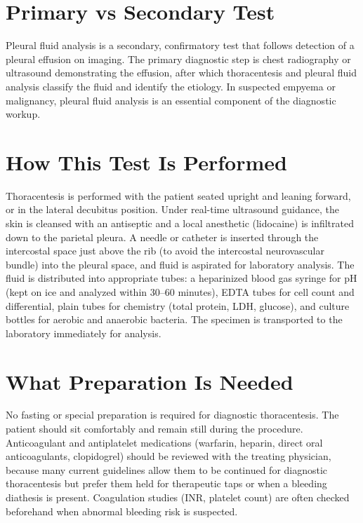 \section*{Primary vs Secondary Test}
Pleural fluid analysis is a secondary, confirmatory test that follows detection of a pleural effusion on imaging. The primary diagnostic step is chest radiography or ultrasound demonstrating the effusion, after which thoracentesis and pleural fluid analysis classify the fluid and identify the etiology. In suspected empyema or malignancy, pleural fluid analysis is an essential component of the diagnostic workup.
\section*{How This Test Is Performed}
Thoracentesis is performed with the patient seated upright and leaning forward, or in the lateral decubitus position. Under real-time ultrasound guidance, the skin is cleansed with an antiseptic and a local anesthetic (lidocaine) is infiltrated down to the parietal pleura. A needle or catheter is inserted through the intercostal space just above the rib (to avoid the intercostal neurovascular bundle) into the pleural space, and fluid is aspirated for laboratory analysis. The fluid is distributed into appropriate tubes: a heparinized blood gas syringe for pH (kept on ice and analyzed within 30--60 minutes), EDTA tubes for cell count and differential, plain tubes for chemistry (total protein, LDH, glucose), and culture bottles for aerobic and anaerobic bacteria. The specimen is transported to the laboratory immediately for analysis.
\section*{What Preparation Is Needed}
No fasting or special preparation is required for diagnostic thoracentesis. The patient should sit comfortably and remain still during the procedure. Anticoagulant and antiplatelet medications (warfarin, heparin, direct oral anticoagulants, clopidogrel) should be reviewed with the treating physician, because many current guidelines allow them to be continued for diagnostic thoracentesis but prefer them held for therapeutic taps or when a bleeding diathesis is present. Coagulation studies (INR, platelet count) are often checked beforehand when abnormal bleeding risk is suspected.
